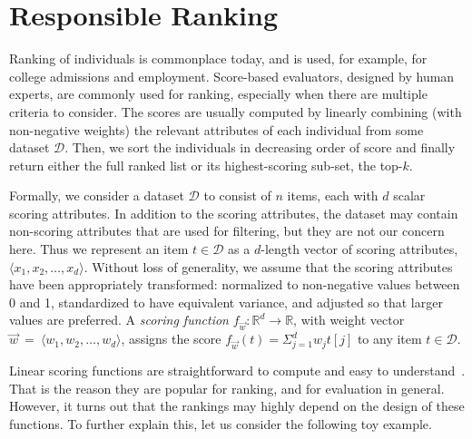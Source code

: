 \section{Responsible Ranking}\label{sec:ranking}
Ranking of individuals is commonplace today, and is used, for example, for college admissions and employment. 
Score-based evaluators, designed by human experts, are commonly used for ranking, especially when there are multiple criteria to consider.
The scores are usually computed by linearly combining (with non-negative weights) the relevant attributes of each individual from some dataset $\mathcal{D}$. Then, we sort the individuals in decreasing order of score and finally return either the full ranked list or its highest-scoring sub-set, the top-$k$. 

Formally, we consider a dataset $\mathcal{D}$ to consist of $n$ items, each with $d$ scalar scoring attributes. In addition to the scoring attributes, the dataset may contain non-scoring attributes that are used for filtering, but they are not our concern here.  Thus we represent an item $t \in \mathcal{D}$ as a $d$-length vector of scoring attributes, $\langle x_1, x_2, \ldots, x_d \rangle$.  Without loss of generality, we assume that the scoring attributes have been appropriately transformed: normalized to non-negative values between 0 and 1, standardized to have equivalent variance, and adjusted so that larger values are preferred.
A {\em scoring function} $f_{\vec{w}}: \mathbb{R}^d\rightarrow\mathbb{R}$, with weight vector $\vec{w} ~ = ~\langle w_1, w_2,\ldots,w_d \rangle$, assigns the score $f_{\vec{w}}(t) = \Sigma_{j=1}^d w_j t[j]$ to any item $t\in\mathcal{D}$.

Linear scoring functions are straightforward to compute and easy to understand~\cite{asudeh2016query}.
That is the reason they are popular for ranking, and for evaluation in general.
However, it turns out that the rankings may highly depend on the design of these functions.
To further explain this, let us consider the following toy example.

